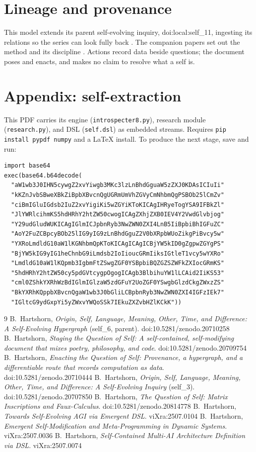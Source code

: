 \documentclass[11pt]{article}
\begin{document}
\section*{Lineage and provenance}
This model extends its parent self-evolving inquiry, doi:local:self\_11, ingesting
its relations so the series can look fully back \cite{p6,paper1,paper2,p3}. The
companion papers set out the method and its discipline \cite{paper1,paper2,paper3}.
Actions record data beside questions; the document poses and enacts, and makes
no claim to resolve what a self is.
\section*{Appendix: self-extraction}
This PDF carries its engine (\texttt{introspecter8.py}), research module
(\texttt{research.py}), and DSL
(\texttt{self.dsl}) as embedded streams. Requires \texttt{pip install pypdf
numpy} and a LaTeX install. To produce the next stage, save and run:
\begin{Verbatim}[fontsize=\small,frame=single]
import base64
exec(base64.b64decode(
  "aW1wb3J0IHN5cywgZ2xvYiwgb3MKc3lzLnBhdGguaW5zZXJ0KDAsICIuIi"
  "kKZnJvbSBweXBkZiBpbXBvcnQgUGRmUmVhZGVyCmNhbmQgPSBOb25lCmZv"
  "ciBmIGluIGdsb2IuZ2xvYigiKi5wZGYiKToKICAgIHRyeTogYSA9IFBkZl"
  "JlYWRlcihmKS5hdHRhY2htZW50cwogICAgZXhjZXB0IEV4Y2VwdGlvbjog"
  "Y29udGludWUKICAgIGlmICJpbnRyb3NwZWN0ZXI4LnB5IiBpbiBhIGFuZC"
  "AoY2FuZCBpcyBOb25lIG9yIG9zLnBhdGguZ2V0bXRpbWUoZikgPiBvcy5w"
  "YXRoLmdldG10aW1lKGNhbmQpKToKICAgICAgICBjYW5kID0gZgpwZGYgPS"
  "BjYW5kIG9yIG1heChnbG9iLmdsb2IoIioucGRmIiksIGtleT1vcy5wYXRo"
  "LmdldG10aW1lKQpmb3IgbmFtZSwgZGF0YSBpbiBQZGZSZWFkZXIocGRmKS"
  "5hdHRhY2htZW50cy5pdGVtcygpOgogICAgb3BlbihuYW1lLCAid2IiKS53"
  "cml0ZShkYXRhWzBdIGlmIGlzaW5zdGFuY2UoZGF0YSwgbGlzdCkgZWxzZS"
  "BkYXRhKQppbXBvcnQgaW1wb3J0bGliLCBpbnRyb3NwZWN0ZXI4IGFzIEk7"
  "IGltcG9ydGxpYi5yZWxvYWQoSSk7IEkuZXZvbHZlKCkK"))
\end{Verbatim}
\begin{thebibliography}{9}
 B.~Hartshorn, \emph{Origin, Self, Language, Meaning, Other, Time,
and Difference: A Self-Evolving Hypergraph} (self\_6, parent).
doi:10.5281/zenodo.20710258
 B.~Hartshorn, \emph{Staging the Question of Self: A
self-contained, self-modifying document that mixes poetry, philosophy, and
code}. doi:10.5281/zenodo.20709754
 B.~Hartshorn, \emph{Enacting the Question of Self: Provenance,
a hypergraph, and a differentiable route that records computation as data}.
doi:10.5281/zenodo.20710444
 B.~Hartshorn, \emph{Origin, Self, Language, Meaning, Other, Time,
and Difference: A Self-Evolving Inquiry} (self\_3). doi:10.5281/zenodo.20707850
 B.~Hartshorn, \emph{The Question of Self: Matrix Inscriptions
and Faux-Calculus}. doi:10.5281/zenodo.20814778
 B.~Hartshorn, \emph{Towards Self-Evolving AGI via Emergent DSL}.
viXra:2507.0104
 B.~Hartshorn, \emph{Emergent Self-Modification and
Meta-Programming in Dynamic Systems}. viXra:2507.0036
 B.~Hartshorn, \emph{Self-Contained Multi-AI Architecture
Definition via DSL}. viXra:2507.0074
\end{thebibliography}
\end{document}
